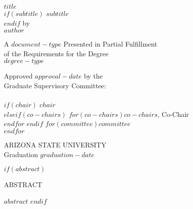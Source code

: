 \documentclass[12pt,letterpaper]{report}
\begin{document}

\setlength{\parindent}{0em}
\newlength{\fiveblanklines}\setlength{\fiveblanklines}{0.7 in}
\newlength{\tenblanklines}\setlength{\tenblanklines}{1.5 in}
\begin{titlepage}
  \enlargethispage{0.5in}
  \thispagestyle{empty}
  \begin{minipage}[t][647.0truept][t]{\linewidth}
    \exactdoublespace
    \begin{center}
      $title$\\
      $if(subtitle)$ $subtitle$\\ $endif$
      by\\
      $author$
    \end{center}
    \singlespace
    \vspace{\fiveblanklines}
    \begin{center}
      \singlespace
      A $document-type$ Presented in Partial Fulfillment\\
      of the Requirements for the Degree\\
      $degree-type$
    \end{center}
    \vspace{\tenblanklines}
    \begin{center}
      \singlespace
      Approved $approval-date$ by the\\
      Graduate Supervisory Committee:\\
      \ \\
      $if(chair)$ $chair$\\
      $elseif(co-chairs)$
      $for(co-chairs)$$co-chairs$, Co-Chair \\$endfor$
      $endif$
      $for(committee)$$committee$ \\ $endfor$
    \end{center}
    \vfill
    \begin{center}
      \doublespace
      ARIZONA STATE UNIVERSITY\\
      Graduation $graduation-date$
    \end{center}
  \end{minipage}
  \clearpage
\end{titlepage}


$if(abstract)$
\setcounter{page}{1}
\begin{center}
  ABSTRACT
\end{center}
\doublespace
$abstract$
\clearpage
$endif$
\end{document}
